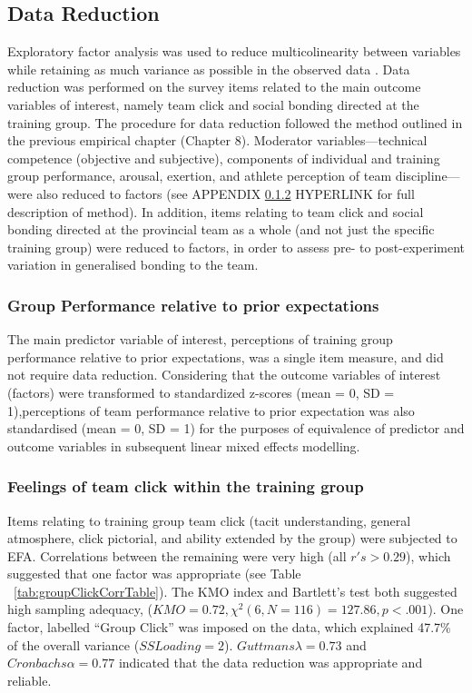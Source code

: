 \subsection{Data Reduction}
Exploratory factor analysis was used to reduce multicolinearity between variables while retaining as much variance as possible in the observed data \citep{Yong2013}.
Data reduction was performed on the survey items related to the main outcome variables of interest, namely team click and social bonding directed at the training group. The procedure for data reduction followed the method outlined in the previous empirical chapter (Chapter 8).  Moderator variables---technical competence (objective and subjective), components of individual and training group performance, arousal, exertion, and athlete perception of team discipline---were also reduced to factors (see APPENDIX \ref{} HYPERLINK for full description of method).  In addition, items relating to team click and social bonding directed at the provincial team as a whole (and not just the specific training group) were reduced to factors, in order to assess pre- to post-experiment variation in generalised bonding to the team.

\subsubsection{Group Performance relative to prior expectations}
The main predictor variable of interest, perceptions of training group performance relative to prior expectations, was a single item measure, and did not require data reduction.  Considering that the outcome variables of interest (factors) were transformed to standardized z-scores (mean = 0, SD = 1),perceptions of team performance relative to prior expectation was also standardised (mean = 0, SD = 1) for the purposes of equivalence of predictor and outcome variables in subsequent linear mixed effects modelling.

\subsubsection{Feelings of team click within the training group}



Items relating to training group team click (tacit understanding, general atmosphere, click pictorial, and ability extended by the group) were subjected to EFA.  Correlations between the remaining were very high (all $r's > 0.29$), which suggested that one factor was appropriate (see Table ~\ref{tab:groupClickCorrTable}). The KMO index and Bartlett's test both suggested high sampling adequacy, ($KMO =  0.72, \chi^2(6, N = 116) = 127.86, p < .001$). One factor, labelled ``Group Click'' was imposed on the data, which explained 47.7\% of the overall variance ($SS Loading = 2$). $Guttmans \lambda = 0.73$ and $Cronbachs \alpha = 0.77$ indicated that the data reduction was appropriate and reliable.

